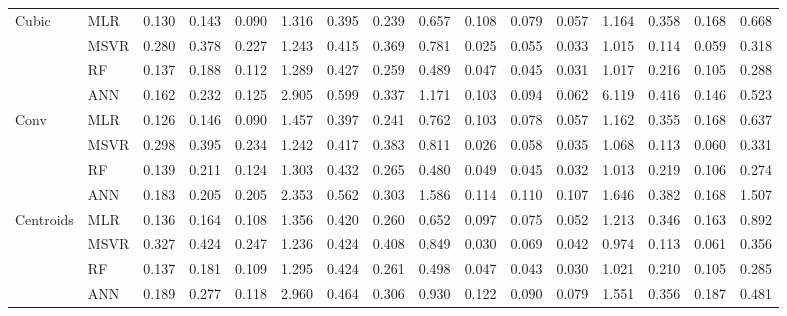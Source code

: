 \documentclass[conference]{IEEEtran}
\begin{document}
\begin{table*}
\begin{tabular}{|p{0.8cm}|p{0.8cm}||c|c||c|c|c|c|c|c|c|c|c|c|c|c|}
\cline{2-16}
\hline
\hline
\multirow{4}{*}{Cubic} &MLR &   0.130 &    0.143 &    0.090 &    1.316 &    0.395 &    0.239 &    0.657 &    0.108 &    0.079 &    0.057 &    1.164 &    0.358 &    0.168 &    0.668\\
\cline{2-16}
 &MSVR &   0.280 &    0.378 &    0.227 &    1.243 &    0.415 &    0.369 &    0.781 &    0.025 &    0.055 &    0.033 &    1.015 &    0.114 &    0.059 &    0.318\\
\cline{2-16}
 &RF &   0.137 &    0.188 &    0.112 &    1.289 &    0.427 &    0.259 &    0.489 &    0.047 &    0.045 &    0.031 &    1.017 &    0.216 &    0.105 &    0.288\\
\cline{2-16}
 &ANN &   0.162 &    0.232 &    0.125 &    2.905 &    0.599 &    0.337 &    1.171 &    0.103 &    0.094 &    0.062 &    6.119 &    0.416 &    0.146 &    0.523\\
\cline{2-16}
\hline
\hline
\multirow{4}{*}{Conv} &MLR &   0.126 &    0.146 &    0.090 &    1.457 &    0.397 &    0.241 &    0.762 &    0.103 &    0.078 &    0.057 &    1.162 &    0.355 &    0.168 &    0.637\\
\cline{2-16}
 &MSVR &   0.298 &    0.395 &    0.234 &    1.242 &    0.417 &    0.383 &    0.811 &    0.026 &    0.058 &    0.035 &    1.068 &    0.113 &    0.060 &    0.331\\
\cline{2-16}
 &RF &   0.139 &    0.211 &    0.124 &    1.303 &    0.432 &    0.265 &    0.480 &    0.049 &    0.045 &    0.032 &    1.013 &    0.219 &    0.106 &    0.274\\
\cline{2-16}
 &ANN &   0.183 &    0.205 &    0.205 &    2.353 &    0.562 &    0.303 &    1.586 &    0.114 &    0.110 &    0.107 &    1.646 &    0.382 &    0.168 &    1.507\\
\cline{2-16}
\hline
\hline
\multirow{4}{*}{Centroids} &MLR &   0.136 &    0.164 &    0.108 &    1.356 &    0.420 &    0.260 &    0.652 &    0.097 &    0.075 &    0.052 &    1.213 &    0.346 &    0.163 &    0.892\\
\cline{2-16}
 &MSVR &   0.327 &    0.424 &    0.247 &    1.236 &    0.424 &    0.408 &    0.849 &    0.030 &    0.069 &    0.042 &    0.974 &    0.113 &    0.061 &    0.356\\
\cline{2-16}
 &RF &   0.137 &    0.181 &    0.109 &    1.295 &    0.424 &    0.261 &    0.498 &    0.047 &    0.043 &    0.030 &    1.021 &    0.210 &    0.105 &    0.285\\
\cline{2-16}
 &ANN &   0.189 &    0.277 &    0.118 &    2.960 &    0.464 &    0.306 &    0.930 &    0.122 &    0.090 &    0.079 &    1.551 &    0.356 &    0.187 &    0.481\\

\end{tabular}
\end{table*}
\end{document}
